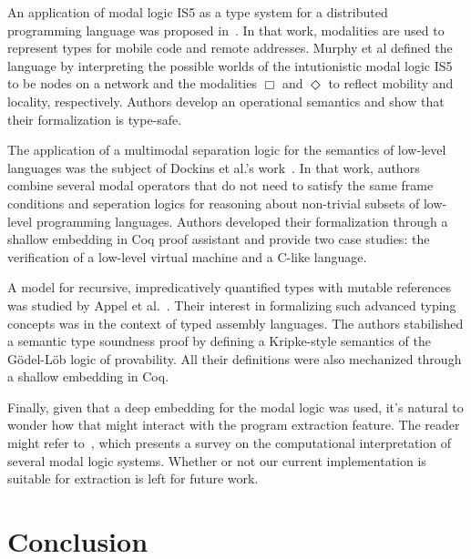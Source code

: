 \documentclass[sigconf]{acmart}
\begin{document}
An application of modal logic IS5 as a type system for a distributed
programming language was proposed in~\cite{Murphy04}. 
In that work, modalities are used to represent types for mobile code
and remote addresses. Murphy et al defined the language by interpreting
the possible worlds of the intutionistic modal logic IS5 to be nodes on a
network and the modalities $\Box$ and $\Diamond$ to reflect mobility and
locality, respectively. Authors develop an operational semantics and show
that their formalization is type-safe.

The application of a multimodal separation logic for the semantics of low-level languages
was the subject of Dockins et al.'s work~\cite{Dockins08}. In that work, authors
combine several modal operators that do not need to satisfy the same frame
conditions and seperation logics for reasoning about non-trivial subsets of
low-level programming languages. Authors developed their formalization through a
shallow embedding in Coq proof assistant and provide two case studies:
the verification of a low-level virtual machine and a C-like language.

A model for recursive, impredicatively quantified types with mutable references
was studied by Appel et al.~\cite{Appel07}. Their interest in formalizing such
advanced typing concepts was in the context of typed assembly languages.
The authors stabilished a semantic type soundness proof by defining a Kripke-style 
semantics of the G\"odel-L\"ob logic of provability. All their definitions were
also mechanized through a shallow embedding in Coq.

Finally, given that a deep embedding for the modal logic was used, it's
natural to wonder how that might interact with the program extraction feature. The
reader might refer to~\cite{Kavvos16c}, which presents a survey on the computational
interpretation of several modal logic systems. Whether or not our current implementation
is suitable for extraction is left for future work.


\section{Conclusion}\label{sec:conclusion}
\end{document}
